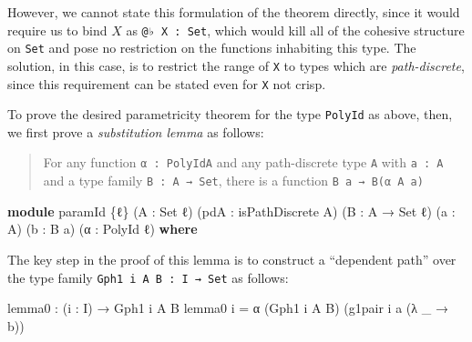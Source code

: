 \documentclass[
  12pt]{article}
\newenvironment{Shaded}{\begin{snugshade}}{\end{snugshade}}
\newcommand{\DataTypeTok}[1]{\textcolor[rgb]{0.00,0.34,0.68}{#1}}
\newcommand{\KeywordTok}[1]{\textcolor[rgb]{0.12,0.11,0.11}{\textbf{#1}}}
\newcommand{\NormalTok}[1]{\textcolor[rgb]{0.12,0.11,0.11}{#1}}
\newcommand{\OtherTok}[1]{\textcolor[rgb]{0.00,0.43,0.16}{#1}}
\begin{document}
However, we cannot state this formulation of the theorem directly, since
it would require us to bind \(X\) as \texttt{@♭\ X\ :\ Set}, which would
kill all of the cohesive structure on \texttt{Set} and pose no
restriction on the functions inhabiting this type. The solution, in this
case, is to restrict the range of \texttt{X} to types which are
\emph{path-discrete}, since this requirement can be stated even for
\texttt{X} not crisp.

To prove the desired parametricity theorem for the type \texttt{PolyId}
as above, then, we first prove a \emph{substitution lemma} as follows:

\begin{quote}
For any function \texttt{α\ :\ PolyIdA} and any path-discrete type
\texttt{A} with \texttt{a\ :\ A} and a type family
\texttt{B\ :\ A\ →\ Set}, there is a function
\texttt{B\ a\ →\ B(α\ A\ a)}
\end{quote}

\begin{Shaded}
\begin{Highlighting}[]
\KeywordTok{module}\NormalTok{ paramId }\OtherTok{\{}\NormalTok{ℓ}\OtherTok{\}} \OtherTok{(}\NormalTok{A }\OtherTok{:} \DataTypeTok{Set}\NormalTok{ ℓ}\OtherTok{)} \OtherTok{(}\NormalTok{pdA }\OtherTok{:}\NormalTok{ isPathDiscrete A}\OtherTok{)} \OtherTok{(}\NormalTok{B }\OtherTok{:}\NormalTok{ A }\OtherTok{→} \DataTypeTok{Set}\NormalTok{ ℓ}\OtherTok{)} 
                   \OtherTok{(}\NormalTok{a }\OtherTok{:}\NormalTok{ A}\OtherTok{)} \OtherTok{(}\NormalTok{b }\OtherTok{:}\NormalTok{ B a}\OtherTok{)} \OtherTok{(}\NormalTok{α }\OtherTok{:}\NormalTok{ PolyId ℓ}\OtherTok{)} \KeywordTok{where}
\end{Highlighting}
\end{Shaded}

The key step in the proof of this lemma is to construct a ``dependent
path'' over the type family \texttt{Gph1\ i\ A\ B\ :\ I\ →\ Set} as
follows:

\begin{Shaded}
\begin{Highlighting}[]
\NormalTok{    lemma0 }\OtherTok{:} \OtherTok{(}\NormalTok{i }\OtherTok{:}\NormalTok{ I}\OtherTok{)} \OtherTok{→}\NormalTok{ Gph1 i A B}
\NormalTok{    lemma0 i }\OtherTok{=}\NormalTok{ α }\OtherTok{(}\NormalTok{Gph1 i A B}\OtherTok{)} \OtherTok{(}\NormalTok{g1pair i a }\OtherTok{(λ} \OtherTok{\_} \OtherTok{→}\NormalTok{ b}\OtherTok{))}
\end{Highlighting}
\end{Shaded}
\end{document}
